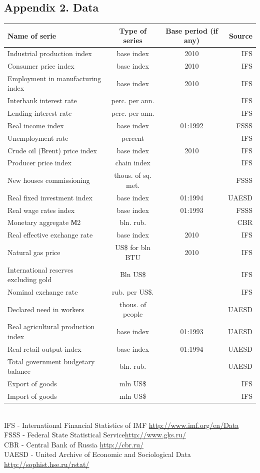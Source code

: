 \documentclass[11pt]{article} %
\begin{document}
\subsection*{Appendix 2. Data}
\begin{center}
\begin{table}[h!]
\begin{tabular}{lccr}
\toprule
Name of serie& Type of series &  Base period (if any) & Source \\
\midrule
Industrial production index & base index & 2010 & IFS \\
Consumer price index & base index  & 2010 & IFS \\
Employment in manufacturing index & base index  & 2010 & IFS \\
Interbank interest rate & perc. per ann. &  & IFS \\
Lending interest rate & perc. per ann.&  & IFS \\
Real income index & base index  & 01:1992 & FSSS\\
Unemployment rate & percent &  & IFS \\
Crude oil (Brent) price index & base index  & 2010 & IFS \\
Producer price index & chain index &  & IFS \\
New houses commissioning & thous. of sq. met. &  & FSSS\\
Real fixed investment  index & base index  & 01:1994 & UAESD\\
Real wage rates index & base index  & 01:1993 & FSSS \\
Monetary aggregate М2 & bln. rub.  &  & CBR \\
Real effective exchange rate & base index  & 2010 & IFS \\
Natural gas price & US\$ for bln BTU & 2010 & IFS \\
International reserves excluding gold & Bln US\$ &  & IFS \\
Nominal exchange rate & rub. per US\$. &  & IFS \\
Declared need in workers  & thous. of people &  & UAESD \\
Real agricultural production index & base index  & 01:1993 & UAESD\\
Real retail output index & base index  & 01:1994 & UAESD\\
Total government budgetary balance & bln. rub. &  & UAESD \\
Export of goods & mln US\$ &  & IFS \\
Import of goods &  mln US\$ &  & IFS \\
\bottomrule
\end{tabular}
\vspace{5mm}\\
IFS - International Financial Statistics of IMF \url{http://www.imf.org/en/Data}\\
FSSS - Federal State Statistical Service\url{http://www.gks.ru/}\\
CBR - Central Bank of Russia \url{http://cbr.ru/}\\
UAESD - United Archive of Economic and Sociological Data \url{http://sophist.hse.ru/rstat/}
\end{table}
\end{center}



\end{document}
